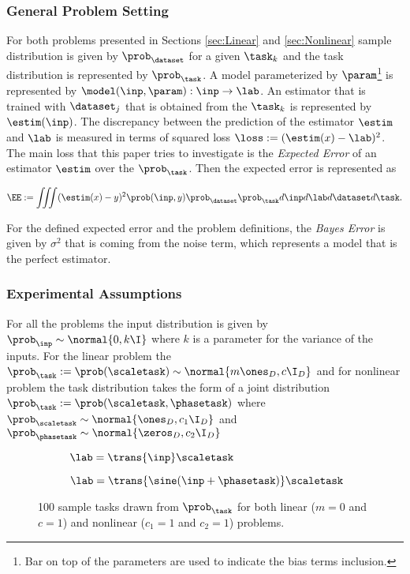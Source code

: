 \subsubsection{General Problem Setting}
For both problems presented in Sections \ref{sec:Linear} and \ref{sec:Nonlinear} sample distribution is given by $\prob_\dataset$ for a given $\task_{k}$ and the task distribution is represented by $\prob_\task$. A model parameterized by $\param$\footnote{Bar on top of the parameters are used to indicate the bias terms inclusion.} is represented by $\model(\inp, \param):\inp\to\lab$. An estimator that is trained with $\dataset_{j}$ that is obtained from the $\task_k$ is represented by $\estim(\inp)$. The discrepancy between the prediction of the estimator $\estim$ and $\lab$ is measured in terms of squared loss $\loss:=(\estim(x)-\lab)^2$. The main loss that this paper tries to investigate is the \textit{Expected Error} of an estimator $\estim$ over the $\prob_{\task}$. Then the expected error is represented as

\begin{equation}\label{eq:ee}
  \EE:= \iiint(\estim(x) - y)^2\prob(\inp, y)\prob_{\dataset}\prob_{\task} d\inp d\lab d\dataset d\task.
\end{equation}

For the defined expected error and the problem definitions, the \textit{Bayes Error} is given by $\sigma^2$ that is coming from the noise term, which represents a model that is the perfect estimator.

\subsubsection{Experimental Assumptions}
For all the problems the input distribution is given by $\prob_\inp\sim\normal{0,k\I}$ where $k$ is a parameter for the variance of the inputs. For the linear problem the $\prob_\task:=\prob(\scaletask)\sim\normal{{m\ones_{D}},{c\I_{D}}}$ and for nonlinear problem the task distribution takes the form of a joint distribution $\prob_\task:=\prob(\scaletask, \phasetask)$ where $\prob_{\scaletask}\sim\normal{\ones_{D},c_1\I_{D}}$ and $\prob_{\phasetask}\sim\normal{\zeros_{D},c_2\I_{D}}$


\begin{figure}[ht!]
  \centering
  \begin{subfigure}[b]{0.49\textwidth}
    \centering
    \caption{$\lab = \trans{\inp}\scaletask$}
    \label{fig:lintasks}
  \end{subfigure}
  \begin{subfigure}[b]{0.49\textwidth}
    \centering
    \caption{$\lab = \trans{\sine(\inp+\phasetask)}\scaletask$}
    \label{fig:nonlintasks}
  \end{subfigure}
  \caption{100 sample tasks drawn from $\prob_\task$ for both linear ($m=0$ and $c=1$) and nonlinear ($c_1=1$ and $c_2=1$) problems.}
\end{figure}

